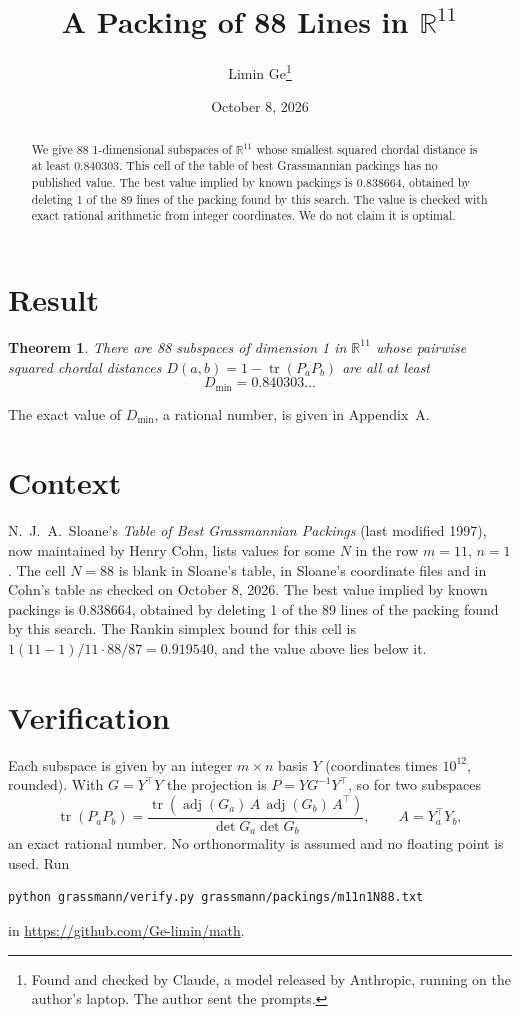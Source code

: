 \documentclass[11pt,a4paper]{article}
\title{A Packing of 88 Lines in $\mathbb{R}^{11}$}
\author{Limin Ge\thanks{Found and checked by Claude, a model released by Anthropic, running on the author's laptop. The author sent the prompts.}}
\date{October 8, 2026}
\newtheorem*{theorem}{Theorem}
\begin{document}
\maketitle
\begin{abstract}
We give 88 1-dimensional subspaces of $\mathbb{R}^{11}$ whose smallest squared chordal distance is at least 0.840303. This cell of the table of best Grassmannian packings has no published value. The best value implied by known packings is 0.838664, obtained by deleting 1 of the 89 lines of the packing found by this search. The value is checked with exact rational arithmetic from integer coordinates. We do not claim it is optimal.
\end{abstract}

\section{Result}
\begin{theorem}
There are 88 subspaces of dimension 1 in $\mathbb{R}^{11}$ whose pairwise squared chordal distances $D(a,b) = 1 - \operatorname{tr}(P_aP_b)$ are all at least
\[ D_{\min} = 0.840303\ldots \]
\end{theorem}
The exact value of $D_{\min}$, a rational number, is given in Appendix~A.


\section{Context}
N.~J.~A.~Sloane's \emph{Table of Best Grassmannian Packings} (last modified 1997), now maintained by Henry Cohn, lists values for some $N$ in the row $m=11$, $n=1$. The cell $N=88$ is blank in Sloane's table, in Sloane's coordinate files and in Cohn's table as checked on October 8, 2026. The best value implied by known packings is 0.838664, obtained by deleting 1 of the 89 lines of the packing found by this search. The Rankin simplex bound for this cell is $1(11-1)/11\cdot 88/87 = 0.919540$, and the value above lies below it.


\section{Verification}
Each subspace is given by an integer $m\times n$ basis $Y$ (coordinates times $10^{12}$, rounded). With $G=Y^\top Y$ the projection is $P=YG^{-1}Y^\top$, so for two subspaces
\[ \operatorname{tr}(P_aP_b)=\frac{\operatorname{tr}(\operatorname{adj}(G_a)\,A\,\operatorname{adj}(G_b)\,A^\top)}{\det G_a\det G_b},\qquad A=Y_a^\top Y_b, \]
an exact rational number. No orthonormality is assumed and no floating point is used. Run
\begin{verbatim}
python grassmann/verify.py grassmann/packings/m11n1N88.txt
\end{verbatim}
in \url{https://github.com/Ge-limin/math}.
\end{document}
